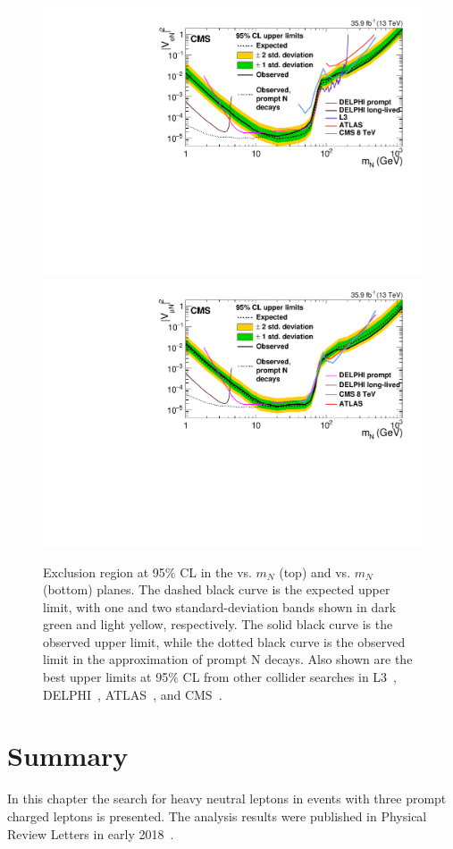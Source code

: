 \begin{figure}[h]
\centering
\includegraphics[width=.80\textwidth]{Figures/c5/limits/CMS-EXO-17-012_Figure_002-a.pdf}\\
\includegraphics[width=.80\textwidth]{Figures/c5/limits/CMS-EXO-17-012_Figure_002-b.pdf}
\caption{Exclusion region at 95$\%$ CL in the \mixpare vs. $m_N$ (top) and \mixparm vs. $m_N$ (bottom) planes.
The dashed black curve is the expected upper limit, with one and two standard-deviation
bands shown in dark green and light yellow, respectively. The solid black curve is the observed
upper limit, while the dotted black curve is the observed limit in the approximation of
prompt N decays. Also shown are the best upper limits at 95$\%$ CL from other collider searches
in L3~\cite{ACHARD200167}, DELPHI~\cite{Abreu:1996pa}, ATLAS~\cite{Aad_2015}, and CMS~\cite{Sirunyan:2018xiv}. \willem}
\label{fig:limits}
\end{figure}

\clearpage
\section{Summary}
In this chapter the search for heavy neutral leptons in events with
three prompt
charged leptons is presented. The analysis
results were published in Physical Review Letters in early 2018~\cite{Sirunyan:2018mtv}.

